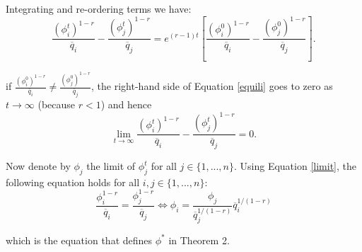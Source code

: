 {
\begin{frame}[c]
Integrating and re-ordering  terms we have:
\begin{equation}
\label{equili}
\frac{(\phi_i^t)^{1-r}}{\overline{q}_i}-\frac{(\phi_j^t)^{1-r}}{\overline{q}_j}= e^{(r-1)t}\left[   \frac{(\phi_i^0)^{1-r}}{\overline{q}_i}-\frac{(\phi_j^0)^{1-r}}{\overline{q}_j} \right].
\end{equation}

if $\displaystyle
  \frac{(\phi_i^0)^{1-r}}{\overline{q}_i}\neq\frac{(\phi_j^0)^{1-r}}{\overline{q}_j}$,
  the right-hand side of Equation \eqref{equili} goes to zero as $t\to \infty$  (because
  $r<1$) and hence
\begin{equation}
\label{limit}
\lim_{t\to\infty} \frac{(\phi_i^t)^{1-r}}{\overline{q}_i}-\frac{(\phi_j^t)^{1-r}}{\overline{q}_j}=0. 
\end{equation}

Now denote by $\phi_j$ the limit of $\phi_j^t$ for all $j \in
\{1,...,n\}$. Using Equation \eqref{limit}, the following equation holds for all $i,j
\in\{1,...,n\}$:
\begin{equation}
\frac{\phi_{i}^{1-r}}{\overline{q}_i}=\frac{\phi_{j}^{1-r}}{\overline{q}_j} \Leftrightarrow \phi_{i}=\frac{\phi_{j}}{\overline{q}_j^{1/(1-r)}}\overline{q}_i^{1/(1-r)}
\end{equation}

which is the equation that defines $\phi^*$ in Theorem 2.

\end{frame}
}


